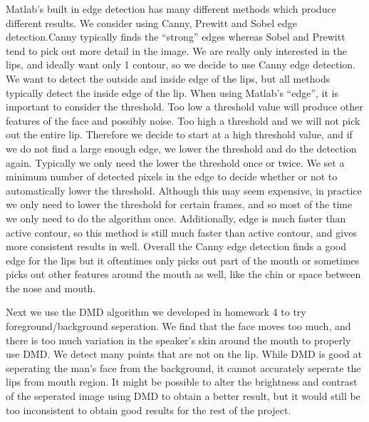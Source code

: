 \documentclass{article}
\begin{document}
 Matlab's built in edge detection has many different methods which produce different results. We consider using Canny, Prewitt and Sobel edge detection.Canny typically finds the ``strong'' edges whereas Sobel and Prewitt tend to pick out more detail in the image. We are really only interested in the lips, and ideally want only 1 contour, so we decide to use Canny edge detection. We want to detect the outside and inside edge of the lips, but all methods typically detect  the inside edge of the lip. When using Matlab's ``edge'', it is important to consider the threshold. Too low a threshold value will produce other features of the face and possibly noise. Too high a threshold and we will not pick out the entire lip. Therefore we decide to start at a high threshold value, and if we do not find a large enough edge, we lower the threshold and do the detection again. Typically we only need the lower the threshold once or twice. We set a minimum number of detected pixels in the edge to decide whether or not to automatically lower the threshold. Although this may seem expensive, in practice we only need to lower the threshold for certain frames, and so most of the time we only need to do the algorithm once.  Additionally, edge is much faster than active contour, so this method is still much faster than active contour, and gives more consistent results in well. Overall the Canny edge detection finds a good edge for the lips but it oftentimes only picks out part of the mouth or sometimes picks out other features around the mouth as well, like the chin or space between the nose and mouth.\par
 Next we use the DMD algorithm we developed in homework 4 to try foreground/background seperation. We find that the face moves too much, and there is too much variation in the speaker's skin around the mouth to properly use DMD. We detect many points that are not on the lip. While DMD is good at seperating the man's face from the background, it cannot accurately seperate the lips from mouth region. It might be possible to alter the brightness and contrast of the seperated image using DMD to obtain a better result, but it would still be too inconsistent to obtain good results for the rest of the project. \par
\end{document}
